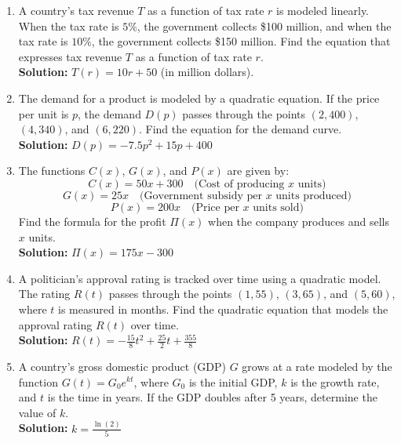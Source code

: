 \documentclass{article}
\begin{document}
\begin{enumerate}[leftmargin = 0.5cm, label = \arabic*., rightmargin = 0.2cm]

    \item A country's tax revenue \(T\) as a function of tax rate \(r\) is modeled linearly. When the tax rate is $5\%$, the government collects \$100 million, and when the tax rate is $10\%$, the government collects \$150 million. Find the equation that expresses tax revenue \(T\) as a function of tax rate \(r\). \\
    \textbf{Solution:} \( T(r) = 10r + 50 \) (in million dollars).

    \item The demand for a product is modeled by a quadratic equation. If the price per unit is \(p\), the demand \(D(p)\) passes through the points $(2, 400)$, $(4, 340)$, and $(6, 220)$. Find the equation for the demand curve. \\
    \textbf{Solution:} \( D(p) = -7.5p^2 +15p + 400 \)

    \item The functions \( C(x) \), \( G(x) \), and \( P(x) \) are given by:
    \[
    C(x) = 50x + 300 \quad \text{(Cost of producing $x$ units)}
    \]
    \[
    G(x) = 25x \quad \text{(Government subsidy per $x$ units produced)}
    \]
    \[
    P(x) = 200x \quad \text{(Price per $x$ units sold)}
    \]
    Find the formula for the profit \( \Pi(x) \) when the company produces and sells \( x \) units. \\
    \textbf{Solution:} \( \Pi(x) = 175x - 300 \)

    \item A politician’s approval rating is tracked over time using a quadratic model. The rating \( R(t) \) passes through the points \( (1, 55) \), \( (3, 65) \), and \( (5, 60) \), where \(t\) is measured in months. Find the quadratic equation that models the approval rating \( R(t) \) over time. \\
    \textbf{Solution:} \( R(t) = -\frac{15}{8}t^2 + \frac{25}{2}t + \frac{355}{8} \)

    \item A country’s gross domestic product (GDP) \(G\) grows at a rate modeled by the function \( G(t) = G_0 e^{kt} \), where \( G_0 \) is the initial GDP, \( k \) is the growth rate, and \( t \) is the time in years. If the GDP doubles after 5 years, determine the value of \(k\). \\
    \textbf{Solution:} \( k = \frac{\ln(2)}{5} \)

\end{enumerate}
\end{document}
